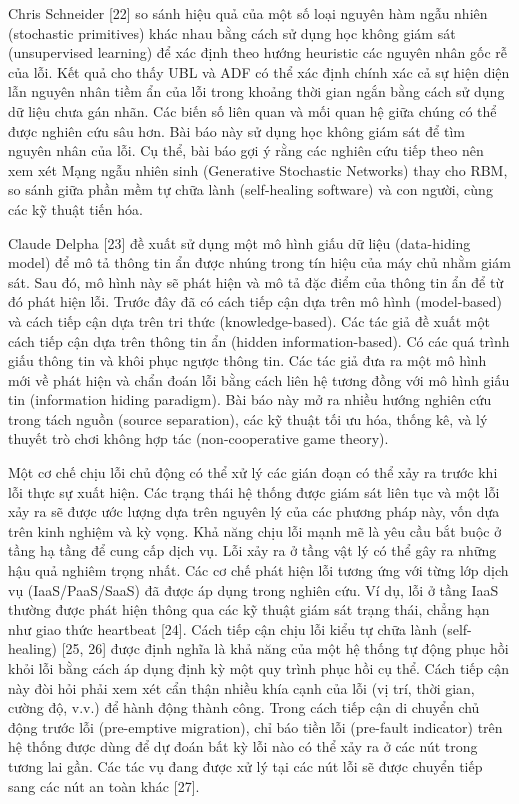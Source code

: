\documentclass[
  vietnamese,
]{article}
\begin{document}
Chris Schneider {[}22{]} so sánh hiệu quả của một số loại nguyên hàm
ngẫu nhiên (stochastic primitives) khác nhau bằng cách sử dụng học không
giám sát (unsupervised learning) để xác định theo hướng heuristic các
nguyên nhân gốc rễ của lỗi. Kết quả cho thấy UBL và ADF có thể xác định
chính xác cả sự hiện diện lẫn nguyên nhân tiềm ẩn của lỗi trong khoảng
thời gian ngắn bằng cách sử dụng dữ liệu chưa gán nhãn. Các biến số liên
quan và mối quan hệ giữa chúng có thể được nghiên cứu sâu hơn. Bài báo
này sử dụng học không giám sát để tìm nguyên nhân của lỗi. Cụ thể, bài
báo gợi ý rằng các nghiên cứu tiếp theo nên xem xét Mạng ngẫu nhiên sinh
(Generative Stochastic Networks) thay cho RBM, so sánh giữa phần mềm tự
chữa lành (self-healing software) và con người, cùng các kỹ thuật tiến
hóa.

Claude Delpha {[}23{]} đề xuất sử dụng một mô hình giấu dữ liệu
(data-hiding model) để mô tả thông tin ẩn được nhúng trong tín hiệu của
máy chủ nhằm giám sát. Sau đó, mô hình này sẽ phát hiện và mô tả đặc
điểm của thông tin ẩn để từ đó phát hiện lỗi. Trước đây đã có cách tiếp
cận dựa trên mô hình (model-based) và cách tiếp cận dựa trên tri thức
(knowledge-based). Các tác giả đề xuất một cách tiếp cận dựa trên thông
tin ẩn (hidden information-based). Có các quá trình giấu thông tin và
khôi phục ngược thông tin. Các tác giả đưa ra một mô hình mới về phát
hiện và chẩn đoán lỗi bằng cách liên hệ tương đồng với mô hình giấu tin
(information hiding paradigm). Bài báo này mở ra nhiều hướng nghiên cứu
trong tách nguồn (source separation), các kỹ thuật tối ưu hóa, thống kê,
và lý thuyết trò chơi không hợp tác (non-cooperative game theory).

Một cơ chế chịu lỗi chủ động có thể xử lý các gián đoạn có thể xảy ra
trước khi lỗi thực sự xuất hiện. Các trạng thái hệ thống được giám sát
liên tục và một lỗi xảy ra sẽ được ước lượng dựa trên nguyên lý của các
phương pháp này, vốn dựa trên kinh nghiệm và kỳ vọng. Khả năng chịu lỗi
mạnh mẽ là yêu cầu bắt buộc ở tầng hạ tầng để cung cấp dịch vụ. Lỗi xảy
ra ở tầng vật lý có thể gây ra những hậu quả nghiêm trọng nhất. Các cơ
chế phát hiện lỗi tương ứng với từng lớp dịch vụ (IaaS/PaaS/SaaS) đã
được áp dụng trong nghiên cứu. Ví dụ, lỗi ở tầng IaaS thường được phát
hiện thông qua các kỹ thuật giám sát trạng thái, chẳng hạn như giao thức
heartbeat {[}24{]}. Cách tiếp cận chịu lỗi kiểu tự chữa lành
(self-healing) {[}25, 26{]} được định nghĩa là khả năng của một hệ thống
tự động phục hồi khỏi lỗi bằng cách áp dụng định kỳ một quy trình phục
hồi cụ thể. Cách tiếp cận này đòi hỏi phải xem xét cẩn thận nhiều khía
cạnh của lỗi (vị trí, thời gian, cường độ, v.v.) để hành động thành
công. Trong cách tiếp cận di chuyển chủ động trước lỗi (pre-emptive
migration), chỉ báo tiền lỗi (pre-fault indicator) trên hệ thống được
dùng để dự đoán bất kỳ lỗi nào có thể xảy ra ở các nút trong tương lai
gần. Các tác vụ đang được xử lý tại các nút lỗi sẽ được chuyển tiếp sang
các nút an toàn khác {[}27{]}.
\end{document}
